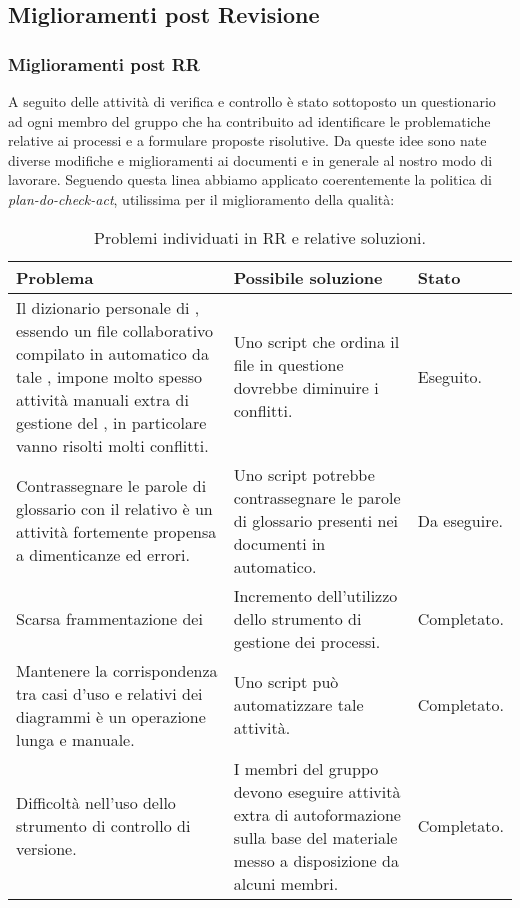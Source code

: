 	
	 \pagebreak
	 \subsection{Miglioramenti post Revisione}
	 
	 	\subsubsection{Miglioramenti post RR}
		A seguito delle attività di verifica e controllo è stato sottoposto un questionario ad ogni membro del gruppo che ha contribuito ad identificare le problematiche relative ai processi e a formulare proposte risolutive. Da queste idee sono nate diverse modifiche e miglioramenti ai documenti e in generale al nostro modo di lavorare. Seguendo questa linea abbiamo applicato coerentemente la politica di \textit{plan-do-check-act}, utilissima per il miglioramento della qualità: \\
			

		\begin{table}[H]
	    \begin{tabular}{ | p{5cm} | p{5cm} | p{2cm} | }
			\hline
			Problema & Possibile soluzione & Stato \\ \hline
		    Il dizionario personale di \glossario{Aspell}, essendo un file collaborativo compilato in automatico da tale \glossario{tool}, impone molto spesso attività manuali extra di gestione del \glossario{repository}, in particolare vanno risolti molti conflitti. & Uno script che ordina il file in questione dovrebbe diminuire i conflitti. & Eseguito. \\ \hline
			 Contrassegnare le parole di glossario con il relativo \glossario{tag} è un attività fortemente propensa a dimenticanze ed errori. & Uno script potrebbe contrassegnare le parole di glossario presenti nei documenti in automatico. & Da eseguire.  \\ \hline
			Scarsa frammentazione dei \glossario{task} & Incremento dell'utilizzo dello strumento di gestione dei processi. & Completato.   \\ \hline
			Mantenere la corrispondenza tra casi d'uso e relativi \glossario{url} dei diagrammi è un operazione lunga e manuale. & Uno script può automatizzare tale attività. & Completato. \\ \hline
			Difficoltà nell'uso dello strumento di controllo di versione. & I membri del gruppo devono eseguire attività extra di autoformazione sulla base del materiale messo a disposizione da alcuni membri. & Completato. \\	
			\hline
	    \end{tabular}
	    	\caption{Problemi individuati in RR e relative soluzioni.}
		\end{table}

